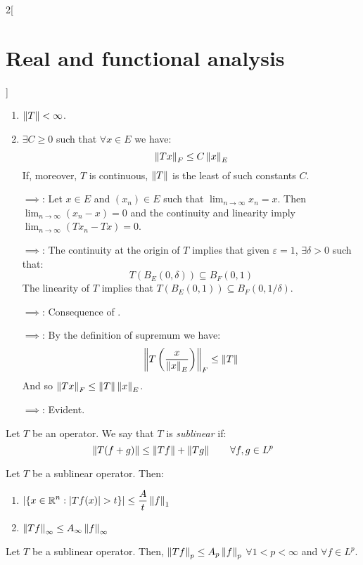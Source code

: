 \documentclass[../../../main_math.tex]{subfiles}
\begin{document}
\begin{multicols}{2}[\section{Real and functional analysis}]
\begin{theorem}
\begin{enumerate}[ref = \arabic{enumi}]
      \item\label{RFA:TcontinuousD} $\left\|T\right\|<\infty$.
      \item\label{RFA:TcontinuousE} $\exists C\geq 0$ such that $\forall x\in E$ we have: $$\left\|Tx\right\|_F\leq C\left\|x\right\|_E$$
      If, moreover, $T$ is continuous, $\left\|T\right\|$ is the least of such constants $C$.
    \end{enumerate}
  \end{theorem}
  \begin{sproof}
    \begin{enumerate}[leftmargin=1.5cm]
      \item[\mref{RFA:TcontinuousA}$\implies$\mref{RFA:TcontinuousB}:] Let $x\in E$ and $(x_n)\in E$ such that $\displaystyle \lim_{n\to\infty}x_n=x$. Then $\displaystyle \lim_{n\to\infty}(x_n - x)=0$ and the continuity and linearity imply $\displaystyle \lim  _{n\to\infty}(Tx_n-Tx)=0$.
      \item[\mref{RFA:TcontinuousB}$\implies$\mref{RFA:TcontinuousC}:] The continuity at the origin of $T$ implies that given $\varepsilon =1$, $\exists \delta>0$ such that: $$T(B_E(0,\delta))\subseteq B_F(0,1)$$
        The linearity of $T$ implies that $T(B_E(0,1))\subseteq B_F(0,1/\delta)$.
      \item[\mref{RFA:TcontinuousC}$\implies$\mref{RFA:TcontinuousD}:] Consequence of .
      \item[\mref{RFA:TcontinuousD}$\implies$\mref{RFA:TcontinuousE}:] By the definition of supremum we have: $$\left\|T\left(\frac{x}{\left\|x\right\|_E}\right)\right\|_F\leq \left\|T\right\|$$ And so $\left\|Tx\right\|_F\leq \left\|T\right\|\left\|x\right\|_E$.
      \item[\mref{RFA:TcontinuousE}$\implies$\mref{RFA:TcontinuousA}:] Evident.
    \end{enumerate}
  \end{sproof}
  \begin{definition}
    Let $T$ be an operator. We say that $T$ is \emph{sublinear} if: $$\left\|T(f+g)\right\|\leq \left\|Tf\right\|+\left\|Tg\right\|\qquad\forall f,g\in L^p$$
  \end{definition}
  \begin{theorem}
    Let $T$ be a sublinear operator. Then:
    \begin{enumerate}
      \item $\displaystyle\abs{\{x\in\mathbb{R}^n:\abs{Tf(x)}>t\}}\leq \frac{A}{t}\left\|f\right\|_1$
      \item $\left\|Tf\right\|_\infty\leq A_\infty\left\|f\right\|_\infty$
    \end{enumerate}
  \end{theorem}
  \begin{corollary}
    Let $T$ be a sublinear operator. Then, $\left\|Tf\right\|_p\leq A_p\left\|f\right\|_p$ $\forall 1<p<\infty$ and $\forall f\in L^p$.
  \end{corollary}

\end{multicols}
\end{document}
